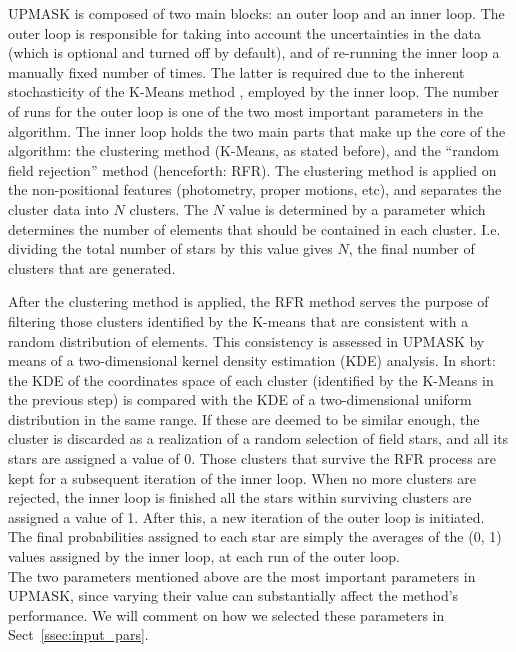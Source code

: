 \documentclass[draft]{aa}
\providecommand{\DIFaddtex}[1]{{\protect\color{blue}\uwave{#1}}} %
\providecommand{\DIFaddbegin}{} %
\providecommand{\DIFaddend}{} %
\providecommand{\DIFadd}[1]{\texorpdfstring{\DIFaddtex{#1}}{#1}} %
\newcommand{\DIFaddincludegraphics}[2][]{{\color{blue}\fbox{\DIFOincludegraphics[#1]{#2}}}} %
\DeclareRobustCommand{\DIFaddbegin}{\DIFOaddbegin \let\includegraphics\DIFaddincludegraphics} %
\DeclareRobustCommand{\DIFaddend}{\DIFOaddend \let\includegraphics\DIFOincludegraphics} %
\begin{document}
 UPMASK is composed of two main blocks: an outer loop and an inner
 loop. The outer loop is responsible for taking into account the uncertainties
 in the data (which is optional and turned off by default), and of re-running
 the inner loop a manually fixed number of times. The latter is required due
 to the inherent stochasticity of the K-Means method \citep{macqueen1967},
 employed by the inner loop. The number of runs for the outer loop is one of
 the two most important parameters in the algorithm.
 The inner loop holds the two main parts that make up the core of the
 algorithm: the clustering method (K-Means, as stated before), and the
 ``random field rejection'' method (henceforth: RFR).
 The clustering method is applied on the non-positional features (photometry,
 proper motions, etc), and separates the cluster data into $N$ clusters. The
 $N$ value is determined by a parameter
 which determines the number of elements that should be
 contained in each cluster. I.e. dividing the total number of stars by this
 value gives $N$, the final number of clusters that are generated.

 After the clustering method is applied, the RFR method serves the purpose of
 filtering those clusters identified by the K-means that are consistent
 with a random \DIFaddbegin \DIFadd{uniform }\DIFaddend distribution of elements. This consistency is assessed
 in UPMASK by means of a two-dimensional kernel density estimation (KDE)
 analysis. In short: the KDE of the coordinates space of each cluster 
 (identified by the K-Means in the previous step) is compared with the KDE of a
 two-dimensional uniform distribution in the same range. If these are deemed
 to be similar enough, the cluster is discarded as a realization of a random
 selection of field stars, and all its stars are assigned a value of 0. Those
 clusters that survive the RFR process are kept for a subsequent iteration of
 the inner loop. When no more clusters are rejected, the inner loop is finished
 all the stars within surviving clusters are assigned a value of 1. After this,
 a new iteration of the outer loop is initiated.
 The final probabilities assigned to each star are simply the averages of the
 (0, 1) values assigned by the inner loop, at each run of the outer loop.\\

 The two parameters mentioned above are the most important parameters in
 UPMASK, since varying their value can substantially affect the
 method's performance. We will comment on how we selected these
 parameters in Sect~\ref{ssec:input_pars}.
\end{document}
